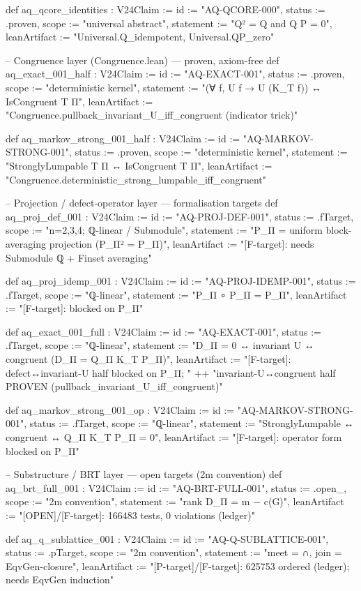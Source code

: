 def aq_qcore_identities : V24Claim :=
  { id := "AQ-QCORE-000", status := .proven, scope := "universal abstract",
    statement := "Q² = Q  and  Q P = 0",
    leanArtifact := "Universal.Q_idempotent, Universal.QP_zero" }

-- Congruence layer (Congruence.lean) — proven, axiom-free
def aq_exact_001_half : V24Claim :=
  { id := "AQ-EXACT-001", status := .proven, scope := "deterministic kernel",
    statement := "(∀ f, U f → U (K_T f))  ↔  IsCongruent T Π",
    leanArtifact := "Congruence.pullback_invariant_U_iff_congruent (indicator trick)" }

def aq_markov_strong_001_half : V24Claim :=
  { id := "AQ-MARKOV-STRONG-001", status := .proven, scope := "deterministic kernel",
    statement := "StronglyLumpable T Π  ↔  IsCongruent T Π",
    leanArtifact := "Congruence.deterministic_strong_lumpable_iff_congruent" }

-- Projection / defect-operator layer — formalisation targets
def aq_proj_def_001 : V24Claim :=
  { id := "AQ-PROJ-DEF-001", status := .fTarget, scope := "n=2,3,4; ℚ-linear / Submodule",
    statement := "P_Π = uniform block-averaging projection  (P_Π² = P_Π)",
    leanArtifact := "[F-target]: needs Submodule ℚ + Finset averaging" }

def aq_proj_idemp_001 : V24Claim :=
  { id := "AQ-PROJ-IDEMP-001", status := .fTarget, scope := "ℚ-linear",
    statement := "P_Π ∘ P_Π = P_Π",
    leanArtifact := "[F-target]: blocked on P_Π" }

def aq_exact_001_full : V24Claim :=
  { id := "AQ-EXACT-001", status := .fTarget, scope := "ℚ-linear",
    statement := "D_Π = 0  ↔  invariant U  ↔  congruent   (D_Π = Q_Π K_T P_Π)",
    leanArtifact := "[F-target]: defect↔invariant-U half blocked on P_Π; " ++
      "invariant-U↔congruent half PROVEN (pullback_invariant_U_iff_congruent)" }

def aq_markov_strong_001_op : V24Claim :=
  { id := "AQ-MARKOV-STRONG-001", status := .fTarget, scope := "ℚ-linear",
    statement := "StronglyLumpable ↔ congruent ↔ Q_Π K_T P_Π = 0",
    leanArtifact := "[F-target]: operator form blocked on P_Π" }

-- Substructure / BRT layer — open targets (2m convention)
def aq_brt_full_001 : V24Claim :=
  { id := "AQ-BRT-FULL-001", status := .open_, scope := "2m convention",
    statement := "rank D_Π = m − c(G)",
    leanArtifact := "[OPEN]/[F-target]: 166483 tests, 0 violations (ledger)" }

def aq_q_sublattice_001 : V24Claim :=
  { id := "AQ-Q-SUBLATTICE-001", status := .pTarget, scope := "2m convention",
    statement := "meet = ∩,  join = EqvGen-closure",
    leanArtifact := "[P-target]/[F-target]: 625753 ordered (ledger); needs EqvGen induction" }

